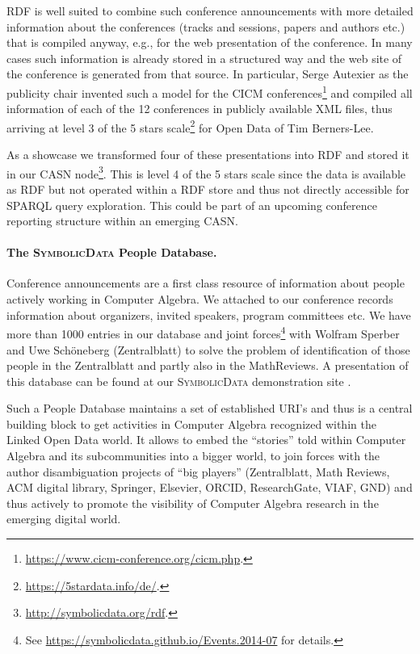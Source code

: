 \documentclass[12pt]{article}
\def\SD{\textsc{Sym\-bolic\-Data}}
\begin{document}
RDF is well suited to combine such conference announcements with more detailed
information about the conferences (tracks and sessions, papers and authors
etc.) that is compiled anyway, e.g., for the web presentation of the
conference.  In many cases such information is already stored in a structured
way and the web site of the conference is generated from that source.  In
particular, Serge Autexier as the publicity chair invented such a model for
the CICM conferences\footnote{\url{https://www.cicm-conference.org/cicm.php}.}
and compiled all information of each of the 12 conferences in publicly
available XML files, thus arriving at level 3 of the 5 stars
scale\footnote{\url{https://5stardata.info/de/}.} for Open Data of Tim
Berners-Lee.

As a showcase we transformed four of these presentations into RDF and stored it
in our CASN node\footnote{\url{http://symbolicdata.org/rdf}.}. This is level 4
of the 5 stars scale since the data is available as RDF but not operated within
a RDF store and thus not directly accessible for SPARQL query exploration.
This could be part of an upcoming conference reporting structure within an
emerging CASN. 

\paragraph{The {\SD} People Database.}
Conference announcements are a first class resource of information about people
actively working in Computer Algebra.  We attached to our conference records
information about organizers, invited speakers, program committees etc.  We
have more than 1000 entries in our database and joint forces\footnote{See
  \url{https://symbolicdata.github.io/Events.2014-07} for details.} with
Wolfram Sperber and Uwe Sch\"oneberg (Zentralblatt) to solve the problem of
identification of those people in the Zentralblatt and partly also in the
MathReviews.  A presentation of this database can be found at our {\SD}
demonstration site \cite{sdinfo}.

Such a People Database maintains a set of established URI's and thus is a
central building block to get activities in Computer Algebra recognized within
the Linked Open Data world.  It allows to embed the ``stories'' told within
Computer Algebra and its subcommunities into a bigger world, to join forces
with the author disambiguation projects of ``big players'' (Zentralblatt, Math
Reviews, ACM digital library, Springer, Elsevier, ORCID, ResearchGate, VIAF,
GND) and thus actively to promote the visibility of Computer Algebra research
in the emerging digital world.
\end{document}
